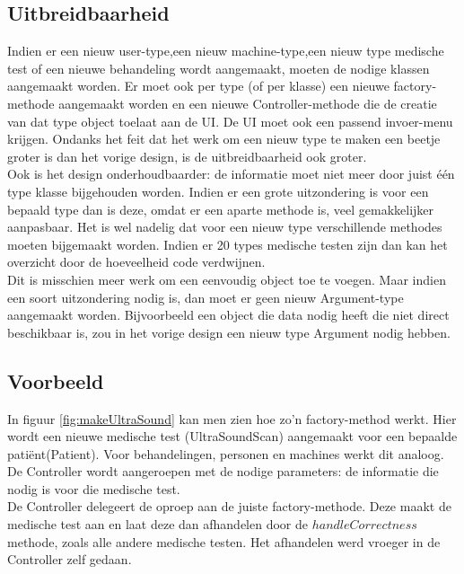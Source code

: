 \subsection{Uitbreidbaarheid}
Indien er een nieuw user-type,een nieuw machine-type,een nieuw type medische test of een nieuwe behandeling wordt aangemaakt, moeten de nodige klassen aangemaakt worden. 
Er moet ook per type (of per klasse) een nieuwe factory-methode aangemaakt worden en een nieuwe Controller-methode die de creatie van dat type object toelaat aan de UI.
De UI moet ook een passend invoer-menu krijgen. 
Ondanks het feit dat het werk om een nieuw type te maken een beetje groter is dan het vorige design, is de uitbreidbaarheid ook groter. \\

Ook is het design onderhoudbaarder: de informatie moet niet meer door juist één type klasse bijgehouden worden. 
Indien er een grote uitzondering is voor een bepaald type dan is deze, omdat er een aparte methode is, veel gemakkelijker aanpasbaar.
Het is wel nadelig dat voor een nieuw type verschillende methodes moeten bijgemaakt worden. 
Indien er 20 types medische testen zijn dan kan het overzicht door de hoeveelheid code verdwijnen.\\

Dit is misschien meer werk om een eenvoudig object toe te voegen.
Maar indien een soort uitzondering nodig is, dan moet er geen nieuw Argument-type aangemaakt worden. 
Bijvoorbeeld een object die data nodig heeft die niet direct beschikbaar is, zou in het vorige design een nieuw type Argument nodig hebben. 

\subsection{Voorbeeld\label{sec:factVB}}
In figuur \ref{fig:makeUltraSound} kan men zien hoe zo'n factory-method werkt. 
Hier wordt een nieuwe medische test (UltraSoundScan) aangemaakt voor een bepaalde patiënt(Patient).
Voor behandelingen, personen en machines werkt dit analoog. 
De Controller wordt aangeroepen met de nodige parameters: de informatie die nodig is voor die medische test. \\

De Controller delegeert de oproep aan de juiste factory-methode. 
Deze maakt de medische test aan en laat deze dan afhandelen door de $handleCorrectness$ methode, zoals alle andere medische testen. 
Het afhandelen werd vroeger in de Controller zelf gedaan. \\

